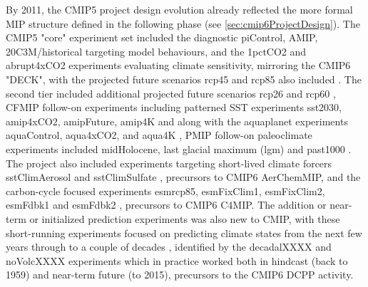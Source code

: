 \documentclass[gmd, preprint]{copernicus}
\newcommand{\mycomment}[1]{}
\begin{document}
By 2011, the CMIP5 project design evolution already reflected the more formal MIP structure defined in the following phase (see \autoref{sec:cmip6ProjectDesign}). The CMIP5 "core" experiment set included the diagnostic piControl, AMIP, 20C3M/historical targeting model behaviours, and the 1pctCO2 and abrupt4xCO2 experiments evaluating climate sensitivity, mirroring the CMIP6 "DECK", with the projected future scenarios rcp45 and rcp85 also included \citep{stouffer_cmip5_2011}. The second tier included additional projected future scenarios rcp26 and rcp60 \citep[precursors to CMIP6 ScenarioMIP experiments;][]{hibbard_primer_2011}, CFMIP follow-on experiments including patterned SST experiments sst2030, amip4xCO2, amipFuture, amip4K and along with the aquaplanet experiments aquaControl, aqua4xCO2, and aqua4K \citep{bony_cfmip_2011}, PMIP follow-on paleoclimate experiments included midHolocene, last glacial maximum (lgm) and past1000 \citep{braconnot_paleoclimate_2011}. The project also included experiments targeting short-lived climate forcers sstClimAerosol and sstClimSulfate \citep{boucher_climate_2011}, precursors to CMIP6 AerChemMIP, and the carbon-cycle focused experiments esmrcp85, esmFixClim1, esmFixClim2, esmFdbk1 and esmFdbk2 \citep{friedlingstein_climate-carbon_2011}, precursors to CMIP6 C4MIP. The addition or near-term or initialized prediction experiments was also new to CMIP, with these short-running experiments focused on predicting climate states from the next few years through to a couple of decades \citep{doblas-reyes_cmip5_2011}, identified by the decadalXXXX and noVolcXXXX experiments which in practice worked both in hindcast (back to 1959) and near-term future (to 2015), precursors to the CMIP6 DCPP activity.

\mycomment{
Map CMIP5 experiments to CMIP6 MIPs
https://github.com/PCMDI/CMIP5_CVs/blob/main/src/writeJson.py
https://docs.google.com/document/d/1bUwK6G_fVZO53UjLZbQUOuBP47PsT8lqKKhL1pjRnKg/edit
}
\end{document}
